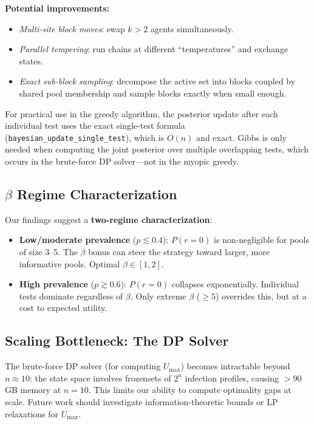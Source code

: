 \documentclass[11pt,a4paper]{article}
\begin{document}
\textbf{Potential improvements:}
\begin{itemize}
  \item \emph{Multi-site block moves}: swap $k > 2$ agents simultaneously.
  \item \emph{Parallel tempering}: run chains at different ``temperatures'' and exchange states.
  \item \emph{Exact sub-block sampling}: decompose the active set into blocks coupled by shared pool membership and sample blocks exactly when small enough.
\end{itemize}

For practical use in the greedy algorithm, the posterior update after each individual test uses the exact single-test formula (\texttt{bayesian\_update\_single\_test}), which is $O(n)$ and exact.
Gibbs is only needed when computing the joint posterior over multiple overlapping tests, which occurs in the brute-force DP solver---not in the myopic greedy.

\subsection{$\beta$ Regime Characterization}

Our findings suggest a \textbf{two-regime characterization}:
\begin{itemize}
  \item \textbf{Low/moderate prevalence} ($p \lesssim 0.4$): $P(r{=}0)$ is non-negligible for pools of size 3--5. The $\beta$ bonus can steer the strategy toward larger, more informative pools. Optimal $\beta \in [1, 2]$.
  \item \textbf{High prevalence} ($p \gtrsim 0.6$): $P(r{=}0)$ collapses exponentially. Individual tests dominate regardless of $\beta$. Only extreme $\beta$ ($\geq 5$) overrides this, but at a cost to expected utility.
\end{itemize}

\subsection{Scaling Bottleneck: The DP Solver}

The brute-force DP solver (for computing $U_{\max}$) becomes intractable beyond $n \approx 10$:
the state space involves frozensets of $2^n$ infection profiles, causing $>90$\,GB memory at $n=10$.
This limits our ability to compute optimality gaps at scale.
Future work should investigate information-theoretic bounds or LP relaxations for $U_{\max}$.
\end{document}
